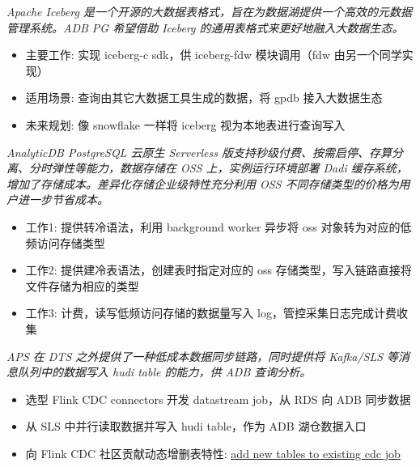 \documentclass{resume}
\begin{document}
\textit{Apache Iceberg 是一个开源的大数据表格式，旨在为数据湖提供一个高效的元数据管理系统。ADB PG 希望借助 Iceberg 的通用表格式来更好地融入大数据生态。}
\begin{onehalfspacing}
\begin{itemize}
  \item 主要工作: 实现 iceberg-c sdk，供 iceberg-fdw 模块调用（fdw 由另一个同学实现）
  \item 适用场景: 查询由其它大数据工具生成的数据，将 gpdb 接入大数据生态
  \item 未来规划: 像 snowflake 一样将 iceberg 视为本地表进行查询写入
\end{itemize}
\end{onehalfspacing}

\textit{AnalyticDB PostgreSQL 云原生 Serverless 版支持秒级付费、按需启停、存算分离、分时弹性等能力，数据存储在 OSS 上，实例运行环境部署 Dadi 缓存系统，增加了存储成本。差异化存储企业级特性充分利用 OSS 不同存储类型的价格为用户进一步节省成本。}
\begin{onehalfspacing}
\begin{itemize}
  \item 工作1: 提供转冷语法，利用 background worker 异步将 oss 对象转为对应的低频访问存储类型
  \item 工作2: 提供建冷表语法，创建表时指定对应的 oss 存储类型，写入链路直接将文件存储为相应的类型
  \item 工作3: 计费，读写低频访问存储的数据量写入 log，管控采集日志完成计费收集
\end{itemize}
\end{onehalfspacing}

\textit{APS 在 DTS 之外提供了一种低成本数据同步链路，同时提供将 Kafka/SLS 等消息队列中的数据写入 hudi table 的能力，供 ADB 查询分析。}
\begin{onehalfspacing}
\begin{itemize}
  \item 选型 Flink CDC connectors 开发 datastream job，从 RDS 向 ADB 同步数据
  \item 从 SLS 中并行读取数据并写入 hudi table，作为 ADB 湖仓数据入口
  \item 向 Flink CDC 社区贡献动态增删表特性: \href{https://github.com/ververica/flink-cdc-connectors/pull/777}{add new tables to existing cdc job}
\end{itemize}
\end{onehalfspacing}
\end{document}
